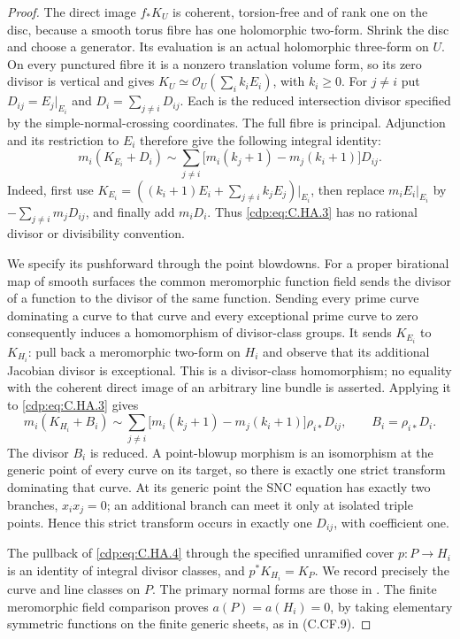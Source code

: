 \begin{proof}
The direct image $f_*K_U$ is coherent, torsion-free and of
rank one on the disc, because a smooth torus fibre has one
holomorphic two-form. Shrink the disc and choose a generator.
Its evaluation is an actual holomorphic three-form on $U$.
On every punctured fibre it is a nonzero translation volume
form, so its zero divisor is vertical and gives
$K_U\simeq\mathcal O_U(\sum_i k_iE_i)$, with $k_i\geq0$.
For $j\ne i$ put $D_{ij}=E_j|_{E_i}$ and
$D_i=\sum_{j\ne i}D_{ij}$. Each is the reduced intersection
divisor specified by the simple-normal-crossing coordinates.
The full fibre is principal. Adjunction and its restriction
to $E_i$ therefore give the following integral identity:
\[
 m_i(K_{E_i}+D_i)
 \sim\sum_{j\ne i}
       \bigl[m_i(k_j+1)-m_j(k_i+1)\bigr]D_{ij}.
\tag{C.HA.3}\label{cdp:eq:C.HA.3}
\]
Indeed, first use
$K_{E_i}=((k_i+1)E_i+\sum_{j\ne i}k_jE_j)|_{E_i}$,
then replace $m_i E_i|_{E_i}$ by
$-\sum_{j\ne i}m_jD_{ij}$, and finally add $m_iD_i$.
Thus \eqref{cdp:eq:C.HA.3} has no rational divisor or divisibility convention.

We specify its pushforward through the point blowdowns.
For a proper birational map of smooth surfaces the common
meromorphic function field sends the divisor of a function
to the divisor of the same function. Sending every prime
curve dominating a curve to that curve and every exceptional
prime curve to zero consequently induces a homomorphism
of divisor-class groups. It sends $K_{E_i}$ to $K_{H_i}$:
pull back a meromorphic two-form on $H_i$ and observe that
its additional Jacobian divisor is exceptional. This is a
divisor-class homomorphism; no equality with the coherent
direct image of an arbitrary line bundle is asserted.
Applying it to \eqref{cdp:eq:C.HA.3} gives
\[
 m_i(K_{H_i}+B_i)
 \sim\sum_{j\ne i}
       \bigl[m_i(k_j+1)-m_j(k_i+1)\bigr]\rho_{i*}D_{ij},
 \qquad B_i=\rho_{i*}D_i.
\tag{C.HA.4}\label{cdp:eq:C.HA.4}
\]
The divisor $B_i$ is reduced. A point-blowup morphism is an
isomorphism at the generic point of every curve on its target,
so there is exactly one strict transform dominating that curve.
At its generic point the SNC equation has exactly two branches,
$x_i x_j=0$; an additional branch can meet it only at isolated
triple points. Hence this strict transform occurs in exactly
one $D_{ij}$, with coefficient one.

The pullback of \eqref{cdp:eq:C.HA.4} through the specified unramified
cover $p:P\to H_i$ is an identity of integral divisor classes,
and $p^*K_{H_i}=K_P$. We record precisely the curve and line
classes on $P$. The primary normal forms are those in
\cite[Theorem~2.1]{Khaled2024Hopf}. The finite meromorphic
field comparison proves $a(P)=a(H_i)=0$, by taking elementary
symmetric functions on the finite generic sheets, as in
(C.CF.9).


\end{proof}
